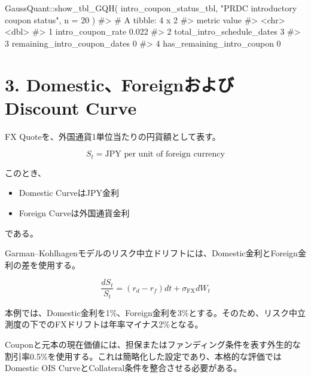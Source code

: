 \documentclass[
  letterpaper,
  DIV=11,
  numbers=noendperiod]{scrreprt}
\newenvironment{Shaded}{\begin{snugshade}}{\end{snugshade}}
\newcommand{\AttributeTok}[1]{\textcolor[rgb]{0.40,0.45,0.13}{#1}}
\newcommand{\CommentTok}[1]{\textcolor[rgb]{0.37,0.37,0.37}{#1}}
\newcommand{\DecValTok}[1]{\textcolor[rgb]{0.68,0.00,0.00}{#1}}
\newcommand{\FunctionTok}[1]{\textcolor[rgb]{0.28,0.35,0.67}{#1}}
\newcommand{\NormalTok}[1]{\textcolor[rgb]{0.00,0.23,0.31}{#1}}
\newcommand{\SpecialCharTok}[1]{\textcolor[rgb]{0.37,0.37,0.37}{#1}}
\newcommand{\StringTok}[1]{\textcolor[rgb]{0.13,0.47,0.30}{#1}}
\providecommand{\tightlist}{%
  \setlength{\itemsep}{0pt}\setlength{\parskip}{0pt}}
\begin{document}
\begin{Shaded}
\begin{Highlighting}[]
\NormalTok{GaussQuant}\SpecialCharTok{::}\FunctionTok{show\_tbl\_GQH}\NormalTok{(}
\NormalTok{  intro\_coupon\_status\_tbl,}
  \StringTok{"PRDC introductory coupon status"}\NormalTok{,}
  \AttributeTok{n =} \DecValTok{20}
\NormalTok{)}
\CommentTok{\#\textgreater{} \# A tibble: 4 x 2}
\CommentTok{\#\textgreater{}   metric                       value}
\CommentTok{\#\textgreater{}   \textless{}chr\textgreater{}                        \textless{}dbl\textgreater{}}
\CommentTok{\#\textgreater{} 1 intro\_coupon\_rate            0.022}
\CommentTok{\#\textgreater{} 2 total\_intro\_schedule\_dates   3    }
\CommentTok{\#\textgreater{} 3 remaining\_intro\_coupon\_dates 0    }
\CommentTok{\#\textgreater{} 4 has\_remaining\_intro\_coupon   0}
\end{Highlighting}
\end{Shaded}

\section{3. Domestic、ForeignおよびDiscount
Curve}\label{domesticforeignux304aux3088ux3073discount-curve}

FX Quoteを、外国通貨1単位当たりの円貨額として表す。

\[
S_t
=
\text{JPY per unit of foreign currency}
\]

このとき、

\begin{itemize}
\tightlist
\item
  Domestic CurveはJPY金利
\item
  Foreign Curveは外国通貨金利
\end{itemize}

である。

Garman--Kohlhagenモデルのリスク中立ドリフトには、Domestic金利とForeign金利の差を使用する。

\[
\frac{dS_t}{S_t}
=
(r_d-r_f)dt
+
\sigma_{\mathrm{FX}}dW_t
\]

本例では、Domestic金利を1\%、Foreign金利を3\%とする。そのため、リスク中立測度の下でのFXドリフトは年率マイナス2\%となる。

Couponと元本の現在価値には、担保またはファンディング条件を表す外生的な割引率0.5\%を使用する。これは簡略化した設定であり、本格的な評価ではDomestic
OIS CurveとCollateral条件を整合させる必要がある。
\end{document}
